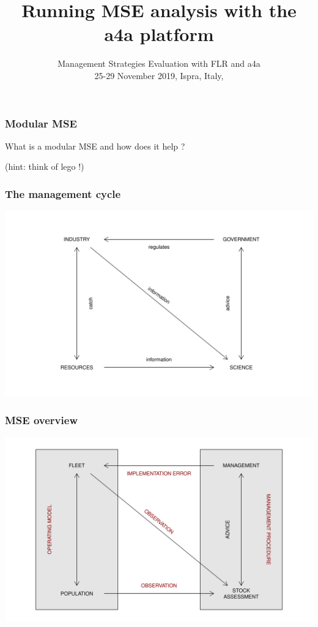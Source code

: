 \documentclass{beamer}\usepackage[]{graphicx}\usepackage[]{color}
\title{Running MSE analysis with the a4a platform}
\subtitle{Management Strategies Evaluation with FLR and a4a \\ 25-29 November 2019, Ispra, Italy, }
\begin{document}
\begin{frame}
\titlepage


\end{frame}

\begin{frame}
\frametitle{Modular MSE}

\Large \centering What is a modular MSE and how does it help ?

\vspace{1cm}

(hint: think of lego !) 

\end{frame}

\begin{frame}
\frametitle{The management cycle}

\begin{center}
\includegraphics[height=0.95\textheight]{managementCycle2}
\end{center}

\end{frame}

\begin{frame}
\frametitle{MSE overview}
	
\begin{center}
\includegraphics[height=0.95\textheight]{mse}
\end{center}
	
\end{frame}
\end{document}
